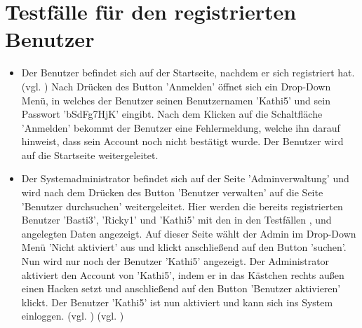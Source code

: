\documentclass[a4paper]{scrreprt}
\newcounter{Lc}
\newcounter{Hc}
\newcommand{\stepHc}{\stepcounter{Hc}\setcounter{Lc}{0}}
\begin{document}
	\section{Testfälle für den registrierten Benutzer}
		\stepHc
		\begin{itemize}
			\item {}
			Der Benutzer befindet sich auf der Startseite, nachdem er sich registriert hat. (vgl. ) Nach Drücken des Button 'Anmelden' öffnet sich ein Drop-Down Menü, in welches der Benutzer seinen Benutzernamen 'Kathi5' und sein Passwort 'bSdFg7HjK' eingibt. Nach dem Klicken auf die Schaltfläche 'Anmelden' bekommt der Benutzer eine Fehlermeldung, welche ihn darauf hinweist, dass sein Account noch nicht bestätigt wurde. Der Benutzer wird auf die Startseite weitergeleitet.
			
			\item {}
			Der Systemadministrator befindet sich auf der Seite 'Adminverwaltung' und wird nach dem Drücken des Button 'Benutzer verwalten' auf die Seite 'Benutzer durchsuchen' weitergeleitet. Hier werden die bereits registrierten Benutzer 'Basti3', 'Ricky1' und 'Kathi5' mit den in den Testfällen ,  und  angelegten Daten angezeigt. Auf dieser Seite wählt der Admin im Drop-Down Menü 'Nicht aktiviert' aus und klickt anschließend auf den Button 'suchen'. Nun wird nur noch der Benutzer 'Kathi5' angezeigt. Der Administrator aktiviert den Account von 'Kathi5', indem er in das Kästchen rechts außen einen Hacken setzt und anschließend auf den Button 'Benutzer aktivieren' klickt. Der Benutzer 'Kathi5' ist nun aktiviert und kann sich ins System einloggen. (vgl. )  
			(vgl. )
			

\end{itemize}
\end{document}
